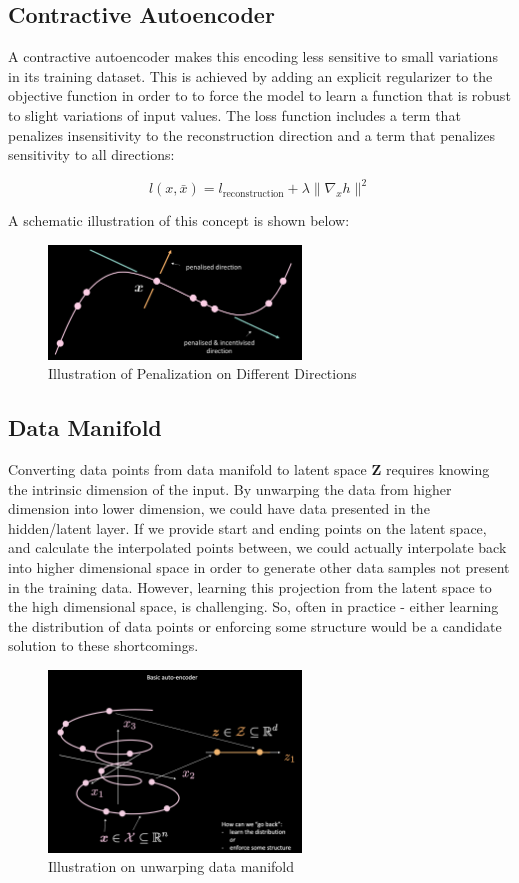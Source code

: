 \subsection{Contractive Autoencoder}

A contractive autoencoder makes this encoding less sensitive to small variations in its training dataset. This is achieved by adding an explicit regularizer to the objective function in order to to force the model to learn a function that is robust to slight variations of input values. The loss function includes a term that penalizes insensitivity to the reconstruction direction and a term that penalizes sensitivity to all directions:

$$l(x,\bar{x}) = l_{\text{reconstruction}} + \lambda \| \nabla_x h \|^2$$

A schematic illustration of this concept is shown below: 

\begin{figure}[H]
    \centering
    \includegraphics[width=0.6\textwidth]{figs/Contractive_AutoEncoder.png}
    \caption{Illustration of Penalization on Different Directions}
    \label{fig:Contractive_AutoEncoder}
\end{figure}

\subsection{Data Manifold}

Converting data points from data manifold to latent space \textbf{Z} requires knowing the intrinsic dimension of the input. By unwarping the data from higher dimension into lower dimension, we could have data presented in the hidden/latent layer. If we provide start and ending points on the latent space, and calculate the interpolated points between, we could actually interpolate back into higher dimensional space in order to generate other data samples not present in the training data. However, learning this projection from the latent space to the high dimensional space, is challenging. So, often in practice - either learning the distribution of data points or enforcing some structure would be a candidate solution to these shortcomings.

\begin{figure}[htb]
    \centering
    \includegraphics[width=0.6\textwidth]{figs/Data_manifold.png}
    \caption{Illustration on unwarping data manifold}
    \label{fig:Data_manifold}
\end{figure}